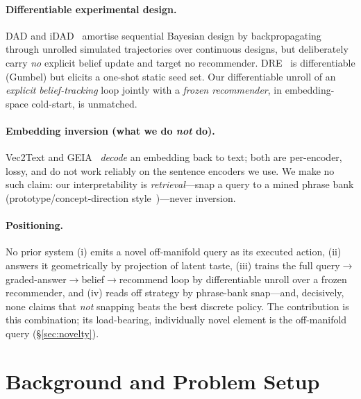 \documentclass[11pt]{article}
\begin{document}
\paragraph{Differentiable experimental design.} DAD and iDAD~\cite{foster21dad} amortise sequential Bayesian design by
backpropagating through unrolled simulated trajectories over continuous designs, but deliberately carry \emph{no}
explicit belief update and target no recommender. DRE~\cite{dre} is differentiable (Gumbel) but elicits a one-shot
static seed set. Our differentiable unroll of an \emph{explicit belief-tracking} loop jointly with a \emph{frozen
recommender}, in embedding-space cold-start, is unmatched.

\paragraph{Embedding inversion (what we do \emph{not} do).} Vec2Text and GEIA~\cite{vec2text,geia} \emph{decode} an
embedding back to text; both are per-encoder, lossy, and do not work reliably on the sentence encoders we use. We make
no such claim: our interpretability is \emph{retrieval}---snap a query to a mined phrase bank (prototype/concept-direction
style~\cite{tcav})---never inversion.

\paragraph{Positioning.} No prior system (i) emits a novel off-manifold query as its executed action, (ii) answers it
geometrically by projection of latent taste, (iii) trains the full query$\to$graded-answer$\to$belief$\to$recommend loop
by differentiable unroll over a frozen recommender, and (iv) reads off strategy by phrase-bank snap---and, decisively,
none claims that \emph{not} snapping beats the best discrete policy. The contribution is this combination; its
load-bearing, individually novel element is the off-manifold query (\S\ref{sec:novelty}).

\section{Background and Problem Setup}\label{sec:setup}
\end{document}
